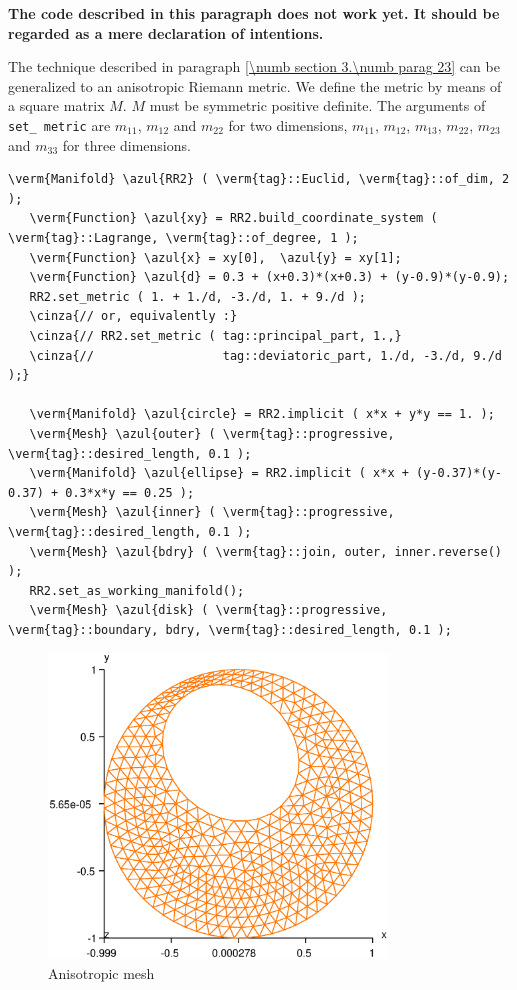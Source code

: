 {\normalfont\bfseries The code described in this paragraph does not work yet.
It should be regarded as a mere declaration of intentions.}
\medskip

The technique described in paragraph \ref{\numb section 3.\numb parag 23} can be generalized to
an anisotropic Riemann metric.
We define the metric by means of a square matrix $M$.
$M$ must be symmetric positive definite.
The arguments of {\small\tt set\_\,metric} are $ m_{11} $, $ m_{12} $ and $ m_{22} $
for two dimensions,
$ m_{11} $, $ m_{12} $, $ m_{13} $, $ m_{22} $, $ m_{23} $ and $ m_{33} $ for three dimensions.

\begin{Verbatim}[commandchars=\\\{\},formatcom=\small\tt,
   baselinestretch=0.94,framesep=2mm                     ]
   \verm{Manifold} \azul{RR2} ( \verm{tag}::Euclid, \verm{tag}::of_dim, 2 );
   \verm{Function} \azul{xy} = RR2.build_coordinate_system ( \verm{tag}::Lagrange, \verm{tag}::of_degree, 1 );
   \verm{Function} \azul{x} = xy[0],  \azul{y} = xy[1];
   \verm{Function} \azul{d} = 0.3 + (x+0.3)*(x+0.3) + (y-0.9)*(y-0.9);
   RR2.set_metric ( 1. + 1./d, -3./d, 1. + 9./d );
   \cinza{// or, equivalently :}
   \cinza{// RR2.set_metric ( tag::principal_part, 1.,}
   \cinza{//                  tag::deviatoric_part, 1./d, -3./d, 9./d );}

   \verm{Manifold} \azul{circle} = RR2.implicit ( x*x + y*y == 1. );
   \verm{Mesh} \azul{outer} ( \verm{tag}::progressive, \verm{tag}::desired_length, 0.1 );
   \verm{Manifold} \azul{ellipse} = RR2.implicit ( x*x + (y-0.37)*(y-0.37) + 0.3*x*y == 0.25 );
   \verm{Mesh} \azul{inner} ( \verm{tag}::progressive, \verm{tag}::desired_length, 0.1 );
   \verm{Mesh} \azul{bdry} ( \verm{tag}::join, outer, inner.reverse() );
   RR2.set_as_working_manifold();
   \verm{Mesh} \azul{disk} ( \verm{tag}::progressive, \verm{tag}::boundary, bdry, \verm{tag}::desired_length, 0.1 );
\end{Verbatim}

\begin{figure} \centering
 \includegraphics[width=90mm]{disk-anisotrop}
  \caption{Anisotropic mesh}
  \label{\numb section 3.\numb fig 11}
\end{figure}

